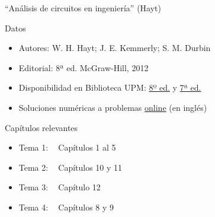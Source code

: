 \documentclass[aspectratio=169, usenames,svgnames,dvipsnames]{beamer}
\begin{document}

\begin{frame}{``Análisis de circuitos en ingeniería'' (\alert{Hayt})}
    \begin{block}{Datos}
        \begin{itemize}
        \item Autores: W. H. Hayt; J. E. Kemmerly; S. M. Durbin
        \item Editorial: 8ª ed. McGraw-Hill, 2012
        \item Disponibilidad en Biblioteca UPM: \href{https://ingenio.upm.es/primo-explore/fulldisplay?docid=34UPM\_ALMA2167505120004212\&context=L\&vid=34UPM\_VU1\&search\_scope=TAB1\_SCOPE1\&isFrbr=true\&tab=tab1\&lang=es\_ES}{8º ed.} y \href{https://ingenio.upm.es/primo-explore/fulldisplay?docid=34UPM\_ALMA2154460960004212\&context=L\&vid=34UPM\_VU1\&search\_scope=TAB1\_SCOPE1\&isFrbr=true\&tab=tab1\&lang=es\_ES}{7ª ed.}
        \item Soluciones numéricas a problemas \href{http://highered.mheducation.com/sites/0073529575/student\_view0/answers\_to\_selected\_problems.html}{online} (en inglés)
        \end{itemize}
    \end{block}
    
    \begin{block}{Capítulos relevantes}
        \begin{itemize}
        \item Tema 1: $\;\;$ Capítulos 1 al 5
        \item Tema 2: $\;\;$ Capítulos 10 y 11
        \item Tema 3: $\;\;$ Capítulo 12
        \item Tema 4: $\;\;$ Capítulos 8 y 9
        \end{itemize}
    \end{block}
\end{frame}

\end{document}

